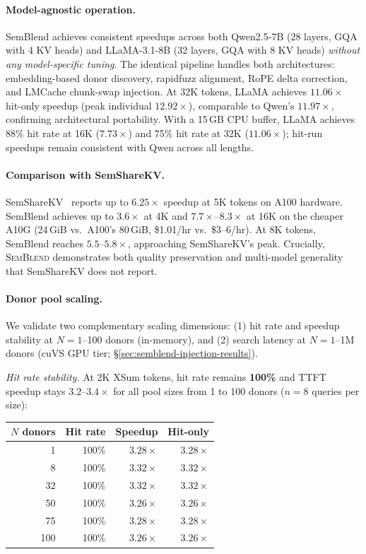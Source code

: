 \documentclass[10pt,twocolumn]{article}
\newcommand{\semblend}{\textsc{SemBlend}\xspace}
\begin{document}
\paragraph{Model-agnostic operation.}
SemBlend achieves consistent speedups across both Qwen2.5-7B (28 layers,
GQA with 4 KV heads) and LLaMA-3.1-8B (32 layers, GQA with 8 KV heads)
\emph{without any model-specific tuning}. The identical pipeline handles
both architectures: embedding-based donor discovery, rapidfuzz alignment,
RoPE delta correction, and LMCache chunk-swap injection. At 32K tokens,
LLaMA achieves $\mathbf{11.06\times}$ hit-only speedup (peak individual
$12.92\times$), comparable to Qwen's $11.97\times$, confirming architectural
portability. With a 15\,GB CPU buffer, LLaMA achieves 88\% hit rate
at 16K ($7.73\times$) and 75\% hit rate at 32K ($11.06\times$);
hit-run speedups remain consistent with Qwen across all lengths.

\paragraph{Comparison with SemShareKV.}
SemShareKV~\cite{semsharekv} reports up to $6.25\times$ speedup at
5K tokens on A100 hardware. SemBlend achieves up to $3.6\times$ at 4K and
$\mathbf{7.7\times}$--$\mathbf{8.3\times}$ at 16K on the cheaper A10G
(24\,GiB vs.\ A100's 80\,GiB, \$1.01/hr vs.\ \$3--6/hr).
At 8K tokens, SemBlend reaches $5.5$--$5.8\times$, approaching
SemShareKV's peak.
Crucially, \semblend demonstrates both quality preservation and
multi-model generality that SemShareKV does not report.

\paragraph{Donor pool scaling.}
We validate two complementary scaling dimensions: (1) hit rate
and speedup stability at $N{=}1$--100 donors (in-memory), and
(2) search latency at $N{=}1$--1M donors (cuVS GPU tier;
\S\ref{sec:semblend-injection-results}).

\emph{Hit rate stability.} At 2K XSum tokens, hit rate
remains \textbf{100\%} and TTFT speedup stays $3.2$--$3.4\times$
for all pool sizes from 1 to 100 donors ($n{=}8$ queries per size):

\begin{center}
\small
\begin{tabular}{@{}rrrr@{}}
\toprule
$N$ donors & Hit rate & Speedup & Hit-only \\
\midrule
1   & 100\% & $3.28\times$ & $3.28\times$ \\
8   & 100\% & $3.32\times$ & $3.32\times$ \\
32  & 100\% & $3.32\times$ & $3.32\times$ \\
50  & 100\% & $3.26\times$ & $3.26\times$ \\
75  & 100\% & $3.28\times$ & $3.28\times$ \\
100 & 100\% & $3.26\times$ & $3.26\times$ \\
\bottomrule
\end{tabular}
\end{center}
\end{document}
